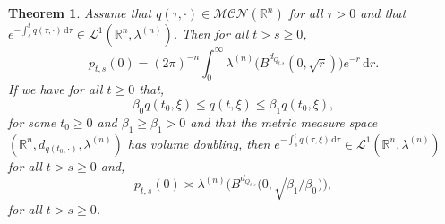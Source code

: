 \documentclass[a4paper, 12pt]{report}
\newtheorem{theorem}{Theorem}[section]
\theoremstyle{cor}
\theoremstyle{remark}
\theoremstyle{definition}
\begin{document}
\begin{theorem}\label{ThesisMainResult}
Assume that $q(\tau, \cdot) \in \mathcal{MCN}(\mathbb{R}^n)$ for all $\tau > 0$ and that $e^{-\int_s^t q(\tau, \cdot)\,\mathrm{d}\tau} \in \mathcal{L}^1(\mathbb{R}^n, \lambda^{(n)})$.  Then for all $t > s \ge 0$,
\begin{equation}
p_{t, s}(0) = (2\pi)^{-n}\int_0^\infty\lambda^{(n)}\big(B^{d_{Q_{t, s}}}(0, \sqrt{r})\big)e^{-r}\,\mathrm{d}r\label{DT}.
\end{equation}
If we have for all $t \ge 0$ that,
\begin{equation}\label{BetaBound}
\beta_0q(t_0, \xi) \le q(t, \xi) \le \beta_1q(t_0, \xi),
\end{equation}
for some $t_0 \ge 0$ and $\beta_1 \ge \beta_1 > 0$ and that the metric measure space $(\mathbb{R}^n, d_{q(t_0, \cdot)}, \lambda^{(n)})$ has volume doubling, then $e^{-\int_s^tq(\tau, \xi)\,\mathrm{d}\tau} \in \mathcal{L}^1(\mathbb{R}^n, \lambda^{(n)})$ for all $t > s \ge 0$ and,
\begin{equation}
p_{t, s}(0) \asymp \lambda^{(n)}\Big(B^{d_{Q_{t, s}}}\big(0, \sqrt{\beta_1/\beta_0}\big)\Big),
\end{equation}
for all $t > s \ge 0$.
\end{theorem}
\end{document}
